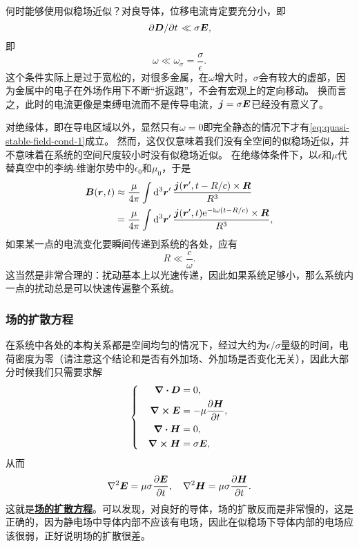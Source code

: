 \documentclass[UTF8, a4paper]{ctexart}
\newcommand*{\ee}{\mathrm{e}}
\newcommand*{\ii}{\mathrm{i}}
\newcommand*{\concept}[1]{\underline{\textbf{#1}}}
\newenvironment{bigcase}{\left\{\quad\begin{aligned}}{\end{aligned}\right.}
\begin{document}
何时能够使用似稳场近似？对良导体，位移电流肯定要充分小，即
\[
    \pdv*{\vb*{D}}{t} \ll \sigma \vb*{E},
\]
即
\begin{equation}
    \omega \ll \omega_\sigma = \frac{\sigma}{\epsilon}.
    \label{eq:quasi-stable-field-cond-1}
\end{equation}
这个条件实际上是过于宽松的，对很多金属，在$\omega$增大时，$\sigma$会有较大的虚部，因为金属中的电子在外场作用下不断“折返跑”，不会有宏观上的定向移动。
换而言之，此时的电流更像是束缚电流而不是传导电流，$\vb*{j} = \sigma \vb*{E}$已经没有意义了。

对绝缘体，即在导电区域以外，显然只有$\omega=0$即完全静态的情况下才有\eqref{eq:quasi-stable-field-cond-1}成立。
然而，这仅仅意味着我们没有全空间的似稳场近似，并不意味着在系统的空间尺度较小时没有似稳场近似。
在绝缘体条件下，以$\epsilon$和$\mu$代替真空中的李纳-维谢尔势中的$\epsilon_0$和$\mu_0$，于是
\[
    \begin{aligned}
        \vb*{B}(\vb*{r}, t) &\approx \frac{\mu}{4\pi} \int \dd[3]{\vb*{r}'} \frac{\vb*{j}(\vb*{r}', t - R / c) \times \vb*{R}}{R^3} \\
        &= \frac{\mu}{4\pi} \int \dd[3]{\vb*{r}'} \frac{\vb*{j}(\vb*{r}', t) \ee^{- \ii \omega (t - R / c)} \times \vb*{R}}{R^3},
    \end{aligned}
\]
如果某一点的电流变化要瞬间传递到系统的各处，应有
\begin{equation}
    R \ll \frac{c}{\omega}.
\end{equation}
这当然是非常合理的：扰动基本上以光速传递，因此如果系统足够小，那么系统内一点的扰动总是可以快速传遍整个系统。

\subsubsection{场的扩散方程}


在系统中各处的本构关系都是空间均匀的情况下，经过大约为$\epsilon/\sigma$量级的时间，电荷密度为零（请注意这个结论和是否有外加场、外加场是否变化无关），因此大部分时候我们只需要求解
\[
    \begin{bigcase}
        \div{\vb*{D}} &= 0, \\
        \curl{\vb*{E}} &= - \mu \pdv{\vb*{H}}{t}, \\
        \div{\vb*{H}} &= 0, \\
        \curl{\vb*{H}} &= \sigma \vb*{E},
    \end{bigcase}
\]
从而
\begin{equation}
    \laplacian{\vb*{E}} = \mu \sigma \pdv{\vb*{E}}{t}, \quad \laplacian{\vb*{H}} = \mu \sigma \pdv{\vb*{H}}{t}.
\end{equation}
这就是\concept{场的扩散方程}。可以发现，对良好的导体，场的扩散反而是非常慢的，这是正确的，因为静电场中导体内部不应该有电场，因此在似稳场下导体内部的电场应该很弱，正好说明场的扩散很差。
\end{document}

